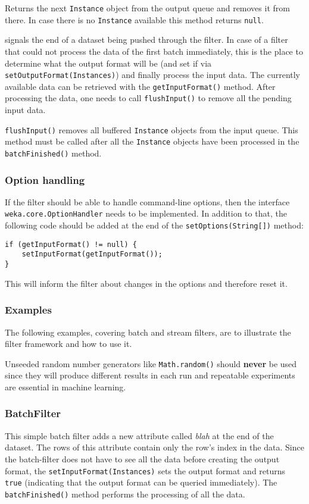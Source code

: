 Returns the next \texttt{Instance} object from the output queue and removes it
from there. In case there is no \texttt{Instance} available this method returns
\texttt{null}.

\newpage
{} signals the end of a dataset being pushed
through the filter. In case of a filter that could not process the data of the
first batch immediately, this is the place to determine what the output format
will be (and set if via \texttt{setOutputFormat(Instances)}) and finally process
the input data. The currently available data can be retrieved with the
\texttt{getInputFormat()} method. After processing the data, one needs to call
\texttt{flushInput()} to remove all the pending input data.

\texttt{flushInput()} removes all buffered \texttt{Instance} objects from the
input queue. This method must be called after all the \texttt{Instance} objects
have been processed in the \texttt{batchFinished()} method.

\subsubsection*{Option handling}
\label{filter_optionhandling}
If the filter should be able to handle command-line options, then the interface
\texttt{weka.core.OptionHandler} needs to be implemented. In addition
to that, the following code should be added at the end of the
\texttt{setOptions(String[])} method:
\begin{verbatim}
if (getInputFormat() != null) {
    setInputFormat(getInputFormat());
}
\end{verbatim}
This will inform the filter about changes in the options and therefore reset it.

\newpage
\subsubsection{Examples}
The following examples, covering batch and stream filters, are to illustrate the
filter framework and how to use it.

Unseeded random number generators like \texttt{Math.random()} should
\textbf{never} be used since they will produce different results in each run and
repeatable experiments are essential in machine learning.

\subsubsection*{BatchFilter}
This simple batch filter adds a new attribute called \textit{blah} at the end of
the dataset. The rows of this attribute contain only the row's index in the
data. Since the batch-filter does not have to see all the data before creating
the output format, the \texttt{setInputFormat(Instances)} sets the output format
and returns \texttt{true} (indicating that the output format can be queried
immediately). The \texttt{batchFinished()} method performs the processing of all
the data.


